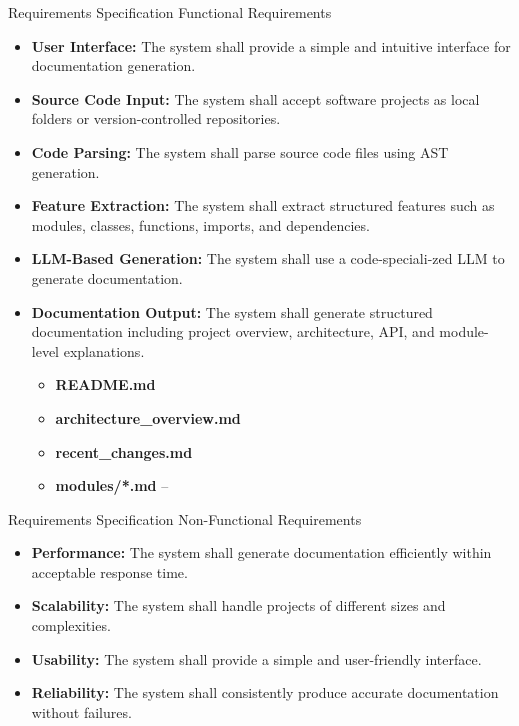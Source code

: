 \documentclass{beamer}
\begin{document}
\begin{frame}[allowframebreaks]{Requirements Specification}
Functional Requirements
\begin{itemize}
\justifying
\item \textbf{User Interface:} The system shall provide a simple and intuitive interface for documentation generation.
\item \textbf{Source Code Input:} The system shall accept software projects as local folders or version-controlled repositories.
\item \textbf{Code Parsing:} The system shall parse source code files using AST generation.
\item \textbf{Feature Extraction:} The system shall extract structured features such as modules, classes, functions, imports, and dependencies.




\item \textbf{LLM-Based Generation:} The system shall use a code-speciali-zed LLM to generate documentation.
\item \textbf{Documentation Output:} The system shall generate structured documentation including project overview, architecture, API, and module-level explanations.
\begin{itemize}
    \item \textbf{README.md}
    \item \textbf{architecture\_overview.md} 
    \item \textbf{recent\_changes.md} 
    \item \textbf{modules/*.md} – 
\end{itemize}
\end{itemize}


\end{frame} 
\begin{frame}{Requirements Specification}
Non-Functional Requirements
\begin{itemize}
\justifying
    \item \textbf{Performance:} The system shall generate documentation efficiently within acceptable response time.
\item \textbf{Scalability:} The system shall handle projects of different sizes and complexities.
\item \textbf{Usability:} The system shall provide a simple and user-friendly interface.
\item \textbf{Reliability:} The system shall consistently produce accurate documentation without failures.
\end{itemize}
\end{frame}
\end{document}
